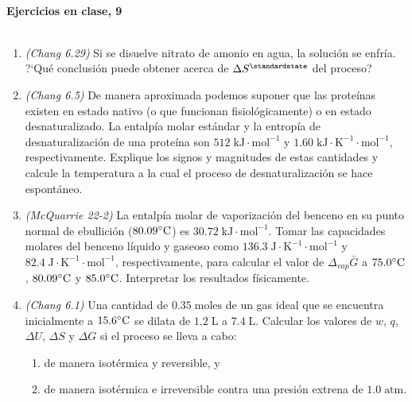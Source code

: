 \documentclass[a4paper,12pt]{article}
\begin{document}

\begin{center}
\HRule \\[0.4cm]
{ \bfseries Ejercicios en clase, 9}\\ %
\HRule \\[0.4cm]
\end{center}


\begin{enumerate}

 \item \textit{(Chang 6.29)} Si se disuelve nitrato de amonio en agua, la soluci\'on se enfr\'ia. ?`Qu\'e conclusi\'on puede obtener acerca de $\Delta S^\standardstate$ del proceso? %

 \item \textit{(Chang 6.5)} De manera aproximada podemos suponer que las prote\'inas existen en estado nativo (o que funcionan fisiol\'ogicamente) o en estado desnaturalizado. La entalp\'ia molar est\'andar y la entrop\'ia de desnaturalizaci\'on de una prote\'ina son $512\;\mbox{kJ}\cdot\mbox{mol}^{-1}$ y $1.60\;\mbox{kJ}\cdot\mbox{K}^{-1}\cdot\mbox{mol}^{-1}$, respectivamente. Explique los signos y magnitudes de estas cantidades y calcule la temperatura a la cual el proceso de desnaturalizaci\'on se hace espont\'aneo. %

 \item \textit{(McQuarrie 22-2)} La entalp\'ia molar de vaporizaci\'on del benceno en su punto normal de ebullici\'on ($80.09\celsius$) es $30.72\;\mbox{kJ}\cdot\mbox{mol}^{-1}$. Tomar las capacidades molares del benceno l\'iquido y gaseoso como $136.3\;\mbox{J}\cdot\mbox{K}^{-1}\cdot\mbox{mol}^{-1}$ y $82.4\;\mbox{J}\cdot\mbox{K}^{-1}\cdot\mbox{mol}^{-1}$, respectivamente, para calcular el valor de $\Delta_{vap}\bar{G}$ a $75.0\celsius$, $80.09\celsius$ y $85.0\celsius$. Interpretar los resultados f\'isicamente. %

 \item \textit{(Chang 6.1)} Una cantidad de $0.35\;\mbox{moles}$ de un gas ideal que se encuentra inicialmente a $15.6\celsius$ se dilata de $1.2\;\mbox{L}$ a $7.4\;\mbox{L}$. Calcular los valores de $w$, $q$, $\Delta U$, $\Delta S$ y $\Delta G$ si el proceso se lleva a cabo:
 \begin{enumerate}
  \item de manera isot\'ermica y reversible, y
  \item de manera isot\'ermica e irreversible contra una presi\'on extrena de $1.0\;\mbox{atm}$.
 \end{enumerate} %


\end{enumerate}
\end{document}
